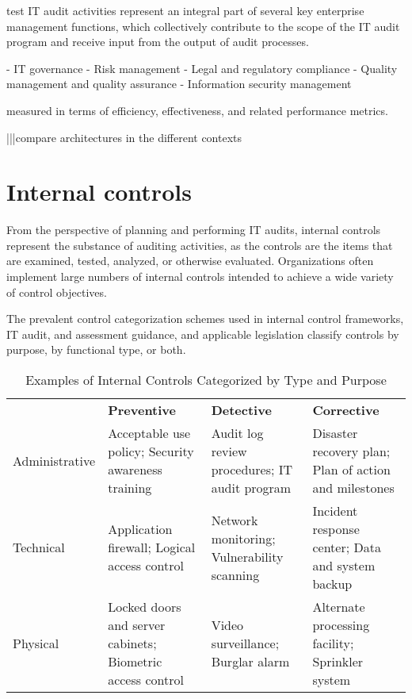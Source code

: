  {test}
IT audit activities represent an integral part of several key enterprise management
functions, which collectively contribute to the scope of the IT audit program and receive
input from the output of audit processes.

- IT governance
- Risk management
- Legal and regulatory compliance
- Quality management and quality assurance
- Information security management

measured in terms of efficiency, effectiveness, and related performance metrics. 

|||compare architectures in the different contexts

\section{Internal controls}

From the perspective of planning and performing IT audits, internal controls
represent the substance of auditing activities, as the controls are the items that are
examined, tested, analyzed, or otherwise evaluated. Organizations often implement
large numbers of internal controls intended to achieve a wide variety of control
objectives.

The prevalent control categorization schemes used in internal control frameworks,
IT audit, and assessment guidance, and applicable legislation classify controls by
purpose, by functional type, or both.

\begin{table}[H]
  \begin{center}
    \caption{Examples of Internal Controls Categorized by Type and Purpose}
    \label{tab:table1}
    \def\arraystretch{1.5}
    \begin{tabularx}{\linewidth}{|l X X X |}
      \hline
      \rowcolor{gray!20}
      \textbf{} & \textbf{Preventive} & \textbf{Detective} & \textbf{Corrective}\\
      Administrative & Acceptable use policy; Security awareness training & Audit log review procedures; IT audit program & Disaster recovery plan; Plan of action and milestones\\
      Technical & Application firewall; Logical access control & Network monitoring; Vulnerability scanning & Incident response center; Data and system backup\\
      Physical & Locked doors and server cabinets; Biometric access control& Video surveillance; Burglar alarm & Alternate processing facility; Sprinkler system\\
      \hline
    \end{tabularx}
  \end{center}
\end{table}

